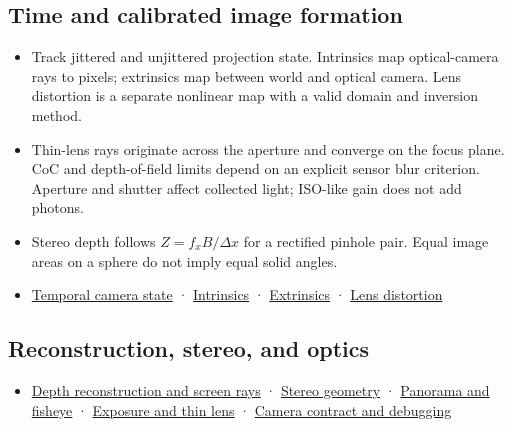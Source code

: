 \subsection{Time and calibrated image formation}\label{appendix-a2b71a18f5a2-time-and-calibrated-image-formation}

\begin{itemize}
\tightlist
\item
  Track jittered and unjittered projection state. Intrinsics map optical-camera rays to pixels; extrinsics map between world and optical camera. Lens distortion is a separate nonlinear map with a valid domain and inversion method.
\item
  Thin-lens rays originate across the aperture and converge on the focus plane. CoC and depth-of-field limits depend on an explicit sensor blur criterion. Aperture and shutter affect collected light; ISO-like gain does not add photons.
\item
  Stereo depth follows \(Z=f_xB/\Delta x\) for a rectified pinhole pair. Equal image areas on a sphere do not imply equal solid angles.
\item
  \hyperref[02-foundations-ii-ch036-a-camera-image-changes-over-time]{Temporal camera state} · \hyperref[02-foundations-ii-ch034-intrinsics-map-optical-rays-to-pixels]{Intrinsics} · \hyperref[02-foundations-ii-ch035-extrinsics-place-the-optical-camera-in-the-world]{Extrinsics} · \hyperref[02-foundations-ii-ch035-real-lenses-bend-the-pinhole-image]{Lens distortion}
\end{itemize}

\subsection{Reconstruction, stereo, and optics}\label{appendix-a2b71a18f5a2-reconstruction-stereo-and-optics}

\begin{itemize}
\tightlist
\item
  \hyperref[02-foundations-ii-ch035-recover-geometry-from-depth-and-construct-screen-space-rays]{Depth reconstruction and screen rays} · \hyperref[02-foundations-ii-ch035-build-projection-and-stereo-geometry-around-real-camera-baselines]{Stereo geometry} · \hyperref[02-foundations-ii-ch035-represent-directions-over-the-full-sphere]{Panorama and fisheye} · \hyperref[02-foundations-ii-ch036-model-exposure-physical-optics-and-depth-of-field]{Exposure and thin lens} · \hyperref[02-foundations-ii-ch037-make-camera-conventions-explicit-and-debug-the-full-transform-chain]{Camera contract and debugging}
\end{itemize}

